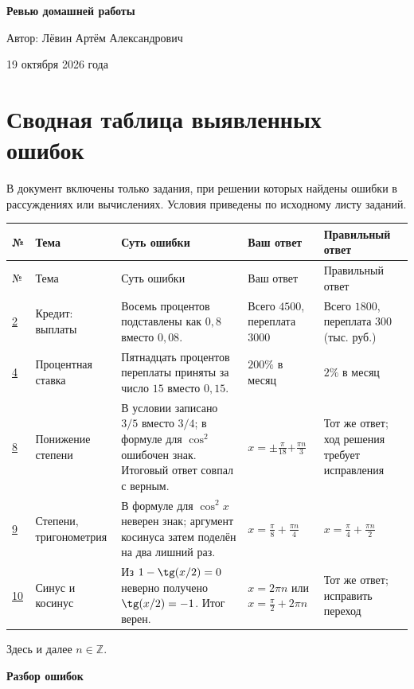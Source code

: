\documentclass[12pt,a4paper]{article}
\begin{document}
\thispagestyle{empty}
\vspace*{0.29\textheight}
\begin{center}
{\LARGE\bfseries Ревью домашней работы\par}
\vspace{25mm}
{\large Автор: Лёвин Артём Александрович\par}
\vspace{9mm}
{\large 19 октября 2026 года\par}
\end{center}
\vfill
\begin{center}
\end{center}
\newpage
\section*{Сводная таблица выявленных ошибок}
В документ включены только задания, при решении которых найдены ошибки в рассуждениях или вычислениях. Условия приведены по исходному листу заданий.
\small
\begin{longtable}{@{}p{.82cm}p{2.35cm}p{4.55cm}p{3.0cm}p{3.55cm}@{}}
\toprule
№ & Тема & Суть ошибки & Ваш ответ & Правильный ответ\\
\midrule
\endfirsthead
\toprule
№ & Тема & Суть ошибки & Ваш ответ & Правильный ответ\\
\midrule
\endhead
\hyperref[task:2]{2} & Кредит: выплаты & Восемь процентов подставлены как $0{,}8$ вместо $0{,}08$. & Всего $4500$, переплата $3000$ & Всего $1800$, переплата $300$ (тыс. руб.)\\
\hyperref[task:4]{4} & Процентная ставка & Пятнадцать процентов переплаты приняты за число $15$ вместо $0{,}15$. & $200\%$ в месяц & $2\%$ в месяц\\
\hyperref[task:8]{8} & Понижение степени & В условии записано $3/5$ вместо $3/4$; в формуле для $\cos^2$ ошибочен знак. Итоговый ответ совпал с верным. & $x=\pm\frac\pi{18}$\newline $+\frac{\pi n}{3}$ & Тот же ответ; ход решения требует исправления\\
\hyperref[task:9]{9} & Степени, тригонометрия & В формуле для $\cos^2x$ неверен знак; аргумент косинуса затем поделён на два лишний раз. & $x=\frac\pi8+\frac{\pi n}{4}$ & $x=\frac\pi4+\frac{\pi n}{2}$\\
\hyperref[task:10]{10} & Синус и косинус & Из $1-\tg(x/2)=0$ неверно получено $\tg(x/2)=-1$. Итог верен. & $x=2\pi n$ или\newline $x=\frac\pi2+2\pi n$ & Тот же ответ; исправить переход\\
\bottomrule
\end{longtable}
\normalsize
Здесь и далее $n\in\mathbb Z$.
\newpage
\thispagestyle{empty}
\vspace*{\fill}
\begin{center}{\LARGE\bfseries Разбор ошибок}\end{center}
\vspace*{\fill}
\newpage
{}\label{task:2}
\end{document}
